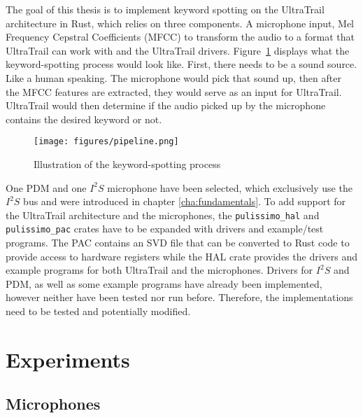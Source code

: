 
The goal of this thesis is to implement keyword spotting on the UltraTrail architecture in Rust,
which relies on three components.
A microphone input, Mel Frequency Cepstral Coefficients (MFCC) \cite[Cha 2.5]{rust_pulp} to transform the audio to
a format that UltraTrail can work with and the UltraTrail drivers.
Figure~\ref{fig:pipeline} displays what the keyword-spotting process would look like.
First, there needs to be a sound source. Like a human speaking.
The microphone would pick that sound up, then after the MFCC features are extracted, they would serve
as an input for UltraTrail. UltraTrail would then determine if the audio picked up by the microphone
contains the desired keyword or not.

\begin{figure}[H]
    \centering
    \texttt{[image: figures/pipeline.png]}
    \caption[Illustration of the keyword-spotting process]{Illustration of the keyword-spotting process}
    \label{fig:pipeline}
\end{figure}

One PDM and one $I^2S$ microphone have been selected, which exclusively use the $I^2S$ bus and were introduced
in chapter \ref{cha:fundamentals}.
To add support for the UltraTrail architecture and the microphones, the \lstinline{pulissimo_hal}
and \lstinline{pulissimo_pac} crates have to be expanded with drivers and example/test programs.
The PAC contains an SVD file that can be converted to Rust code to provide access to hardware registers
while the HAL crate provides the drivers and example programs for both UltraTrail and the microphones.
Drivers for $I^2S$ and PDM, as well as some example programs have already been implemented,
however neither have been tested nor run before.
Therefore, the implementations need to be tested and potentially modified.

\section{Experiments}

\subsection{Microphones}

